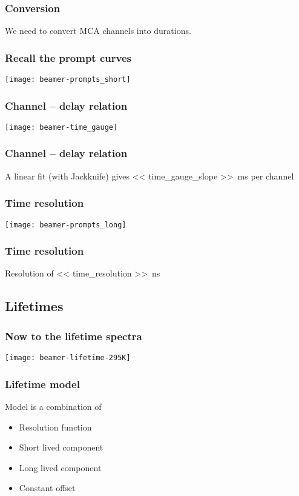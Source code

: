 \documentclass[english, fleqn]{beamer}
\begin{document}
\begin{frame}
    \frametitle{Conversion}

    We need to convert MCA channels into durations.
\end{frame}

\begin{frame}
    \frametitle{Recall the prompt curves}

    \centering
    \texttt{[image: beamer-prompts\_short]}
\end{frame}

\begin{frame}
    \frametitle{Channel -- delay relation}

    \centering
    \texttt{[image: beamer-time\_gauge]}
\end{frame}

\begin{frame}
    \frametitle{Channel -- delay relation}

    A linear fit (with Jackknife) gives
    \SI{<< time_gauge_slope >>}{\milli\second} per channel
\end{frame}


\begin{frame}
    \frametitle{Time resolution}

    \centering
    \texttt{[image: beamer-prompts\_long]}
\end{frame}

\begin{frame}
    \frametitle{Time resolution}

    Resolution of \SI{<< time_resolution >>}{\nano\second}
\end{frame}

\subsection{Lifetimes}

\begin{frame}
    \frametitle{Now to the lifetime spectra}
    
    \centering
    \texttt{[image: beamer-lifetime-295K]}
\end{frame}

\begin{frame}
    \frametitle{Lifetime model}

    Model is a combination of
    \begin{itemize}
        \item Resolution function
        \item Short lived component
        \item Long lived component
        \item Constant offset
    \end{itemize}
\end{frame}
\end{document}
